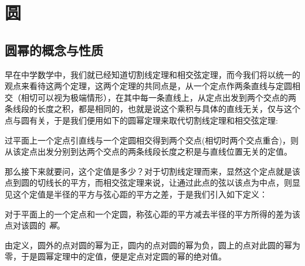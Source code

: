 
\section{圆}
\label{sec:circle}

\subsection{圆幂的概念与性质}
\label{sec:power-of-circle}

早在中学数学中，我们就已经知道切割线定理和相交弦定理，而今我们将以统一的观点来看待这两个定理，这两个定理的共同点是，从一个定点作两条直线与定圆相交（相切可以视为极端情形），在其中每一条直线上，从定点出发到两个交点的两条线段的长度之积，都是相同的，也就是说这个乘积与具体的直线无关，仅与这个点与圆有关，于是我们便用如下的圆幂定理来取代切割线定理和相交弦定理:

\begin{theorem}[圆幂定理]
  过平面上一个定点引直线与一个定圆相交得到两个交点(相切时两个交点重合)，则从该定点出发分别到达两个交点的两条线段长度之积是与直线位置无关的定值。
\end{theorem}

那么接下来就要问，这个定值是多少？对于切割线定理而来，显然这个定点就是该点到圆的切线长的平方，而相交弦定理来说，让通过此点的弦以该点为中点，则显见这个定值是半径的平方与弦心距的平方之差，于是我们引入如下定义：

\begin{definition}
  对于平面上的一个定点和一个定圆，称弦心距的平方减去半径的平方所得的差为该点对该圆的 \emph{幂}。
\end{definition}

由定义，圆外的点对圆的幂为正，圆内的点对圆的幂为负，圆上的点对此圆的幂为零，于是圆幂定理中的定值，便是定点对定圆的幂的绝对值。


